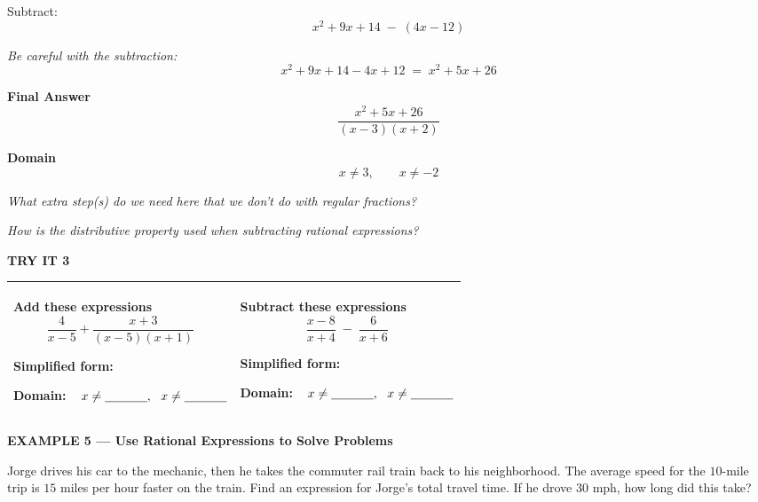 \documentclass[11pt]{article}
\newcommand{\blank}[1][1.2cm]{\underline{\hspace{#1}}}
\newcommand{\examplehead}[1]{%
  \bigskip\noindent%
  \begin{tcolorbox}[colback=examplebg,colframe=examplebg,boxrule=0pt,
                    left=5pt,right=5pt,top=3pt,bottom=3pt,arc=1pt]%
    \large\bfseries #1%
  \end{tcolorbox}\smallskip}
\newcommand{\sidequestion}[1]{%
  \smallskip\noindent\textit{\small #1}\par}
\begin{document}
Subtract:
\[ x^{2} + 9x + 14 \;-\; (4x - 12) \]

\textit{Be careful with the subtraction:}
\[ x^{2} + 9x + 14 - 4x + 12 \;=\; x^{2} + 5x + 26 \]

\textbf{Final Answer}
\[ \frac{x^{2} + 5x + 26}{(x-3)(x+2)} \]

\textbf{Domain}
\[ x \neq 3, \qquad x \neq -2 \]

\smallskip
\sidequestion{What extra step(s) do we need here that we don't do with regular fractions?}
\vspace{1.4cm}

\sidequestion{How is the distributive property used when subtracting rational expressions?}
\vspace{1.4cm}

\textbf{TRY IT 3}

\renewcommand{\arraystretch}{1.3}
\begin{tabularx}{\textwidth}{|>{\raggedright\arraybackslash}X|>{\raggedright\arraybackslash}X|}
\hline
\begin{minipage}[t][7.5cm][t]{\linewidth}
\textbf{Add these expressions}
\[ \frac{4}{x-5} + \frac{x+3}{(x-5)(x+1)} \]
\vspace{3.0cm}

\textbf{Simplified form:}

\vspace{0.9cm}
\textbf{Domain:}\ \ $x \neq \blank,\ \ x \neq \blank$
\end{minipage}
&
\begin{minipage}[t][7.5cm][t]{\linewidth}
\textbf{Subtract these expressions}
\[ \frac{x-8}{x+4} \;-\; \frac{6}{x+6} \]
\vspace{3.0cm}

\textbf{Simplified form:}

\vspace{0.9cm}
\textbf{Domain:}\ \ $x \neq \blank,\ \ x \neq \blank$
\end{minipage}
\\ \hline
\end{tabularx}
\renewcommand{\arraystretch}{1.0}

\examplehead{EXAMPLE 5 --- Use Rational Expressions to Solve Problems}

Jorge drives his car to the mechanic, then he takes the commuter rail train
back to his neighborhood. The average speed for the $10$-mile trip is
$15$ miles per hour faster on the train. Find an expression for Jorge's total
travel time. If he drove $30$ mph, how long did this take?
\end{document}
